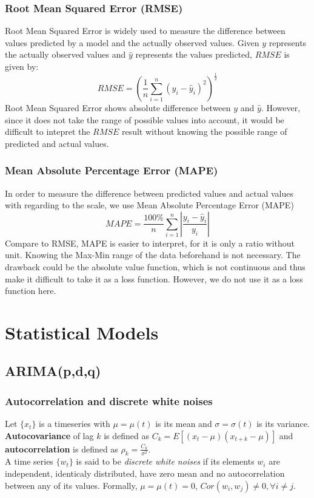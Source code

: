 \documentclass[11pt]{article}
\begin{document}
\subsubsection{Root Mean Squared Error (RMSE)}
Root Mean Squared Error is widely used to measure the difference between values
predicted by a model and the actually observed values. Given $y$ represents the
actually observed values and $\hat{y}$ represents the values predicted, $RMSE$
is given by:
$$
RMSE = \left( \frac{1}{n}\sum _{i=1}^{n}(y_i -\hat{y}_i)^2 \right)^\frac{1}{2}
$$
Root Mean Squared Error shows absolute difference between $y$ and $\hat{y}$.
However, since it does not take the range of possible values into account, it
would be difficult to intepret the $RMSE$ result without knowing the possible
range of predicted and actual values. 

\subsubsection{Mean Absolute Percentage Error (MAPE)}
In order to measure the difference between predicted values and actual values
with regarding to the scale, we use Mean Absolute Percentage Error (MAPE)
$$
MAPE = \frac{100\%}{n}\sum  _{i=1}^{n}\left| \frac{y_i -\hat{y}_i}{y_i} \right|
$$
Compare to RMSE, MAPE is easier to interpret, for it is only a ratio without
unit. Knowing the Max-Min range of the data beforehand is not necessary. The
drawback could be the absolute value function, which is not continuous and thus
make it difficult to take it as a loss function. However, we do not use it as a
loss function here.

\section{Statistical Models}
\subsection{ARIMA(p,d,q)}
\subsubsection{Autocorrelation and discrete white noises}
Let $\{x_t\}$ is a timeseries with $\mu=\mu(t)$ is its mean and
$\sigma=\sigma(t)$ is its variance. \textbf{Autocovariance} of lag $k$ is
defined as $C_k=E[(x_t-\mu)(x_{t+k}-\mu)]$ and \textbf{autocorrelation} is defined
as $\rho_k=\frac{C_k}{\sigma^2}$.\\
A time series $\{w_t\}$ is said to be \textit{discrete white noises} if its
elements $w_i$ are independent, identicaly distributed, have zero mean and no
autocorrelation between any of its values. Formally, $\mu=\mu(t)=0$,
$Cor(w_i,w_j)\neq 0, \forall i \neq j$.
\end{document}
